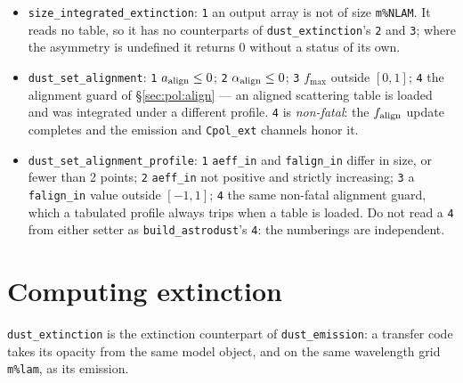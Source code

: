 \documentclass{my_memo}
\newcommand{\code}[1]{\texttt{#1}}
\begin{document}
\begin{itemize}
      make. \code{Cext}, \code{Cabs}, \code{Csca} and \code{albedo} are
      filled and valid, and the call succeeds. It is the state of a model
      whose optics arrive with a scattering cross section and no asymmetry
      parameter. No model shipped here is in it: Guillet et al.\ (2018)
      Model D was, the DustEM distribution carrying no \code{G\_} file for
      the two populations that hold 90\% of its dust mass, until SEDust
      computed those two tables (\S\ref{sec:g18d-gsca}).
\item \code{size\_integrated\_extinction}: \code{1} an output array is not of
      size \code{m\%NLAM}. It reads no table, so it has no counterparts of
      \code{dust\_extinction}'s \code{2} and \code{3}; where the asymmetry is
      undefined it returns $0$ without a status of its own.
\item \code{dust\_set\_alignment}: \code{1} $a_{\rm align} \le 0$;
      \code{2} $\alpha_{\rm align} \le 0$; \code{3} $f_{\max}$ outside
      $[0,1]$; \code{4} the alignment guard of \S\ref{sec:pol:align} ---
      an aligned scattering table is loaded and was integrated under a
      different profile. \code{4} is \emph{non-fatal}: the $f_{\rm align}$
      update completes and the emission and \code{Cpol\_ext} channels honor it.
\item \code{dust\_set\_alignment\_profile}: \code{1} \code{aeff\_in} and
      \code{falign\_in} differ in size, or fewer than 2 points;
      \code{2} \code{aeff\_in} not positive and strictly increasing;
      \code{3} a \code{falign\_in} value outside $[-1,1]$; \code{4} the same
      non-fatal alignment guard, which a tabulated profile always trips when a
      table is loaded. Do not read a \code{4} from either setter as
      \code{build\_astrodust}'s \code{4}: the numberings are independent.
\end{itemize}

\section{Computing extinction}\label{sec:ext}

\code{dust\_extinction} is the extinction counterpart of \code{dust\_emission}:
a transfer code takes its opacity from the same model object, and on the same
wavelength grid \code{m\%lam}, as its emission.
\end{document}
